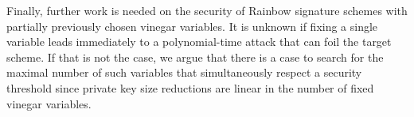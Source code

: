 \documentclass[12pt, a4paper, oneside]{memoir}
\theoremstyle{definition}
\begin{document}
Finally, further work is needed on the security of Rainbow signature schemes with partially previously chosen vinegar variables. It is unknown if fixing a single variable leads immediately to a polynomial-time attack that can foil the target scheme. If that is not the case, we argue that there is a case to search for the maximal number of such variables that simultaneously respect a security threshold since private key size reductions are linear in the number of fixed vinegar variables.



\end{document}
